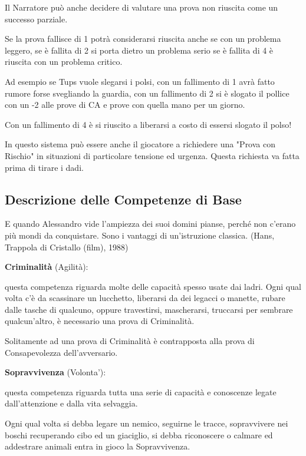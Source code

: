 \documentclass[a4paper,11pt,twoside,openany]{book}
\begin{document}
Il Narratore può anche decidere di valutare una prova non riuscita come un successo parziale.

Se la prova fallisce di 1 potrà considerarsi riuscita anche se con un problema leggero, se è fallita di 2 si porta dietro un problema serio se è fallita di 4 è riuscita con un problema critico.

Ad esempio se Tups vuole slegarsi i polsi, con un fallimento di 1 avrà fatto rumore forse svegliando la guardia, con un fallimento di 2 si è slogato il pollice con un -2 alle prove di CA e prove con quella mano per un giorno.

Con un fallimento di 4 è si riuscito a liberarsi a costo di essersi slogato il polso!


In questo sistema può essere anche il giocatore a richiedere una "Prova con Rischio" in situazioni di particolare tensione ed urgenza. Questa richiesta va fatta prima di tirare i dadi.

\pagebreak

\subsection{Descrizione delle Competenze di Base}

\label{descrizione-delle-competenze-di-base}
\begin{tcolorbox}[enhanced,arc=5pt,boxrule=0.3pt]{
		E quando Alessandro vide l'ampiezza dei suoi domini pianse, perché non c'erano più mondi da conquistare. Sono i vantaggi di un'istruzione classica. (Hans, Trappola di Cristallo (film), 1988)
	}\end{tcolorbox}\medskip

\textbf{Criminalità} (Agilità):

questa competenza riguarda molte delle capacità spesso usate dai ladri. Ogni qual volta c'è da scassinare un lucchetto, liberarsi da dei legacci o manette, rubare dalle tasche di qualcuno, oppure travestirsi, mascherarsi, truccarsi per sembrare qualcun'altro, è necessario una prova di Criminalità.

Solitamente ad una prova di Criminalità è contrapposta alla prova di Consapevolezza dell'avversario.

\textbf{Sopravvivenza} (Volonta'):

questa competenza riguarda tutta una serie di capacità e conoscenze legate dall'attenzione e dalla vita selvaggia.

Ogni qual volta si debba legare un nemico, seguirne le tracce, sopravvivere nei boschi recuperando cibo ed un giaciglio,  si debba riconoscere o calmare ed addestrare animali entra in gioco la Sopravvivenza.
\end{document}
